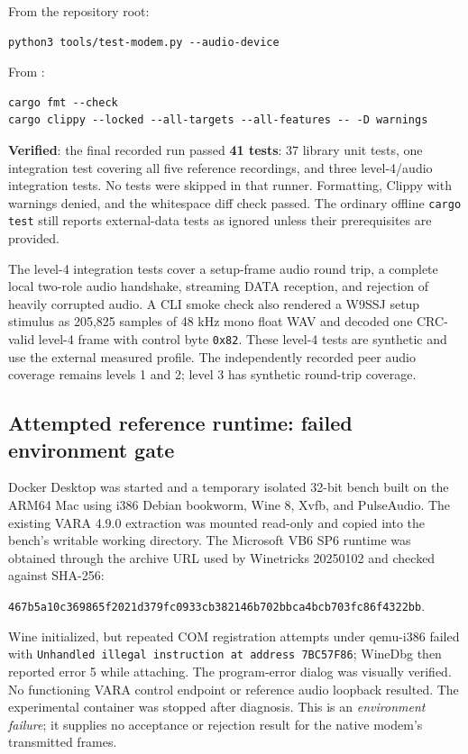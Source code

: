 \documentclass[11pt,a4paper]{article}
\newcommand{\statusverified}{\textcolor{verified}{\textbf{Verified}}}
\newcommand{\pathtext}[1]{\path{#1}}
\newcommand{\hashtext}[4]{\texttt{\small #1\allowbreak{}#2\allowbreak{}#3\allowbreak{}#4}}
\begin{document}
From the repository root:
\begin{lstlisting}
python3 tools/test-modem.py --audio-device
\end{lstlisting}
From \pathtext{rust/}:
\begin{lstlisting}
cargo fmt --check
cargo clippy --locked --all-targets --all-features -- -D warnings
\end{lstlisting}

\statusverified{}: the final recorded run passed \textbf{41 tests}: 37 library
unit tests, one integration test covering all five reference recordings, and
three level-4/audio integration tests. No tests were skipped in that runner.
Formatting, Clippy with warnings denied, and the whitespace diff check passed.
The ordinary offline \texttt{cargo test} still reports external-data tests as
ignored unless their prerequisites are provided.

The level-4 integration tests cover a setup-frame audio round trip, a complete
local two-role audio handshake, streaming DATA reception, and rejection of
heavily corrupted audio. A CLI smoke check also rendered a W9SSJ setup stimulus
as 205,825 samples of 48 kHz mono float WAV and decoded one CRC-valid level-4
frame with control byte \texttt{0x82}. These level-4 tests are synthetic and
use the external measured profile. The independently recorded peer audio
coverage remains levels 1 and 2; level 3 has synthetic round-trip coverage.

\subsection{Attempted reference runtime: failed environment gate}
Docker Desktop was started and a temporary isolated 32-bit bench built on the
ARM64 Mac using i386 Debian bookworm, Wine 8, Xvfb, and PulseAudio. The existing
VARA 4.9.0 extraction was mounted read-only and copied into the bench's writable
working directory. The Microsoft VB6 SP6 runtime was obtained through the
archive URL used by Winetricks 20250102 and checked against SHA-256:
\begin{center}
\hashtext{467b5a10c369865f}{2021d379fc0933cb}{382146b702bbca4b}{cb703fc86f4322bb}.
\end{center}

Wine initialized, but repeated COM registration attempts under qemu-i386
failed with \texttt{Unhandled illegal instruction at address 7BC57F86}; WineDbg
then reported error 5 while attaching. The program-error dialog was visually
verified. No functioning VARA control endpoint or reference audio loopback
resulted. The experimental container was stopped after diagnosis. This is an
\emph{environment failure}; it supplies no acceptance or rejection result for
the native modem's transmitted frames.
\end{document}
